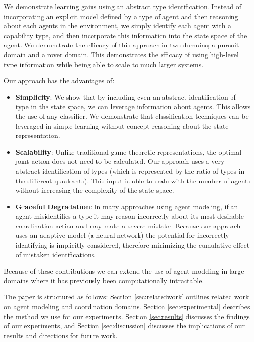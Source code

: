 \documentclass{aamas2014}
\begin{document}
We demonstrate learning gains using an abstract type identification. Instead of incorporating an explicit model defined by a type of agent and then reasoning about each agents in the environment, we simply identify each agent with a capability type, and then incorporate this information into the state space of the agent. We demonstrate the efficacy of this approach in two domains; a pursuit domain and a rover domain. This demonstrates the efficacy of using high-level type information while being able to scale to much larger systems.

Our approach has the advantages of:
\begin{itemize}
\item \textbf{Simplicity}: We show that by including even an abstract identification of type in the state space, we can leverage information about agents. This allows the use of any classifier. We demonstrate that classification techniques can be leveraged in simple learning without concept reasoning about the state representation.

\item \textbf{Scalability}: Unlike traditional game theoretic representations, the optimal joint action does not need to be calculated. Our approach uses a very abstract identification of types (which is represented by the ratio of types in the different quadrants). This input is able to scale with the number of agents without increasing the complexity of the state space.

\item \textbf{Graceful Degradation}: In many approaches using agent modeling, if an agent misidentifies a type it may reason incorrectly about its most desirable coordination action and may make a severe mistake. Because our approach uses an adaptive model (a neural network) the potential for incorrectly identifying is implicitly considered, therefore minimizing the cumulative effect of mistaken identifications.

\end{itemize}

Because of these contributions we can extend the use of agent modeling in large domains where it has previously been computationally intractable.

The paper is structured as follows: Section \ref{sec:relatedwork} outlines related work on agent modeling and coordination domains. Section \ref{sec:experimental} describes the method we use for our experiments. Section \ref{sec:results} discusses the findings of our experiments, and Section \ref{sec:discussion} discusses the implications of our results and directions for future work.
\end{document}
